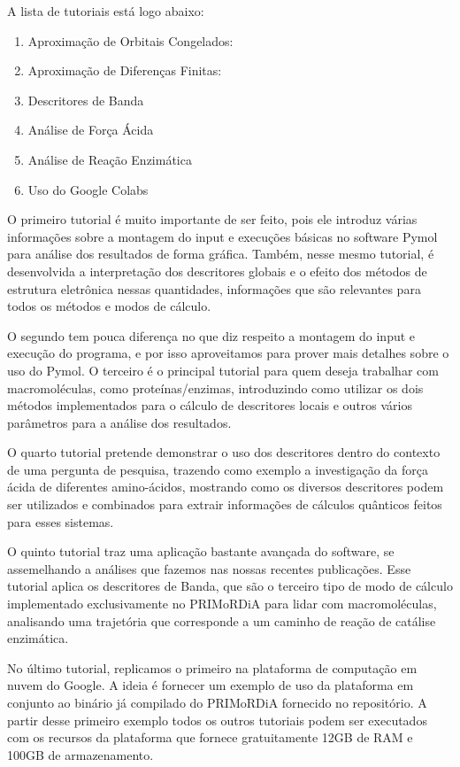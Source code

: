 \documentclass[a4paper,11pt]{refart}
\begin{document}
A lista de tutoriais está logo abaixo:

\begin{enumerate}
	\item Aproximação de Orbitais Congelados:
	\item Aproximação de Diferenças Finitas:
	\item Descritores de Banda
	\item Análise de Força Ácida
	\item Análise de Reação Enzimática
	\item Uso do Google Colabs
\end{enumerate}

O primeiro tutorial é muito importante de ser feito, pois ele introduz várias informações sobre a montagem do input e execuções básicas no software Pymol para análise dos resultados de forma gráfica. Também, nesse mesmo tutorial, é desenvolvida a interpretação dos descritores globais e o efeito dos métodos de estrutura eletrônica nessas quantidades, informações que são relevantes para todos os métodos e modos de cálculo. 

O segundo tem pouca diferença no que diz respeito a montagem do input e execução do programa, e por isso aproveitamos para prover mais detalhes sobre o uso do Pymol. O terceiro é o principal tutorial para quem deseja trabalhar com macromoléculas, como proteínas/enzimas, introduzindo como utilizar os dois métodos implementados para o cálculo de descritores locais e outros vários parâmetros para a análise dos resultados.

O quarto tutorial pretende demonstrar o uso dos descritores dentro do contexto de uma pergunta de pesquisa, trazendo como exemplo a investigação da força ácida de diferentes amino-ácidos, mostrando como os diversos descritores podem ser utilizados e combinados para extrair informações de cálculos quânticos feitos para esses sistemas. 

O quinto tutorial traz uma aplicação bastante avançada do software, se assemelhando a análises que fazemos nas nossas recentes publicações. Esse tutorial aplica os descritores de Banda, que são o terceiro tipo de modo de cálculo implementado exclusivamente no PRIMoRDiA para lidar com macromoléculas, analisando uma trajetória que corresponde a um caminho de reação de catálise enzimática. 

No último tutorial, replicamos o primeiro na plataforma de computação em nuvem do Google. A ideia é fornecer um exemplo de uso da plataforma em conjunto ao binário já compilado do PRIMoRDiA fornecido no repositório. A partir desse primeiro exemplo todos os outros tutoriais podem ser executados com os recursos da plataforma que fornece gratuitamente 12GB de RAM e 100GB de armazenamento. 
\end{document}
